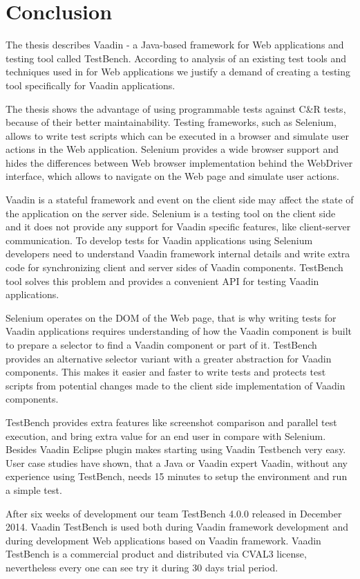 \chapter {Conclusion}
\label{ch:conclusion}
 The thesis describes Vaadin - a Java-based framework for Web applications and
testing tool called TestBench.
 According to analysis of an existing test tools and techniques used in for Web
applications we justify a demand of creating a testing tool specifically
for Vaadin applications. 

The thesis shows the advantage of using programmable tests against C\&R tests,
because of their better maintainability. Testing frameworks, such as Selenium,
allows to write test scripts which can be executed in a browser and simulate
user actions in the Web application. Selenium provides a wide browser support
and hides the differences between Web browser implementation behind the
WebDriver interface, which allows to navigate on the Web page and simulate user
actions.

Vaadin is a stateful framework and event on the client side may affect the state
of the application on the server side. Selenium is a testing tool on the client
side and it does not provide any support for Vaadin specific features, like
client-server communication. To develop tests for Vaadin applications using
Selenium developers need to understand Vaadin framework internal details and 
write extra code for synchronizing client and server sides of Vaadin components.
TestBench tool solves this problem and provides a convenient API for testing Vaadin applications.

Selenium operates on the DOM of the Web page, that is why writing tests for
Vaadin applications requires understanding of how the Vaadin component is
built to prepare a selector to find a Vaadin component or part of it. TestBench
provides an alternative selector variant with a greater abstraction for Vaadin components.
This makes it easier and faster to write tests and protects test scripts from potential
changes made to the client side implementation of Vaadin components.

TestBench provides extra features like screenshot comparison and
parallel test execution, and bring extra value for an end user in compare with
Selenium. Besides Vaadin Eclipse plugin makes starting using Vaadin Testbench
very easy. User case studies have shown, that a Java or Vaadin expert Vaadin, without any experience using TestBench, needs 15 minutes to setup the
 environment and run a simple test.

After six weeks of development our team TestBench 4.0.0 released in December
2014.  Vaadin TestBench is used both during Vaadin framework development and
during development Web applications based on Vaadin framework. Vaadin TestBench is a commercial product
 and distributed via CVAL3 license,  nevertheless every one can see try it during 30 days trial period.


 
